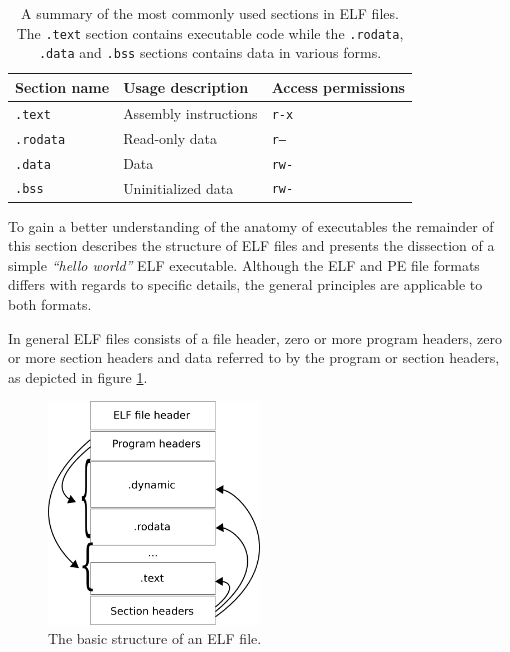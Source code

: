 \documentclass[12pt, a4paper]{article}
\begin{document}
\begin{table}[htbp]
	\begin{center}
		\begin{tabular}{|l|l|l|}
			\hline
			Section name & Usage description & Access permissions \\
			\hline
			\texttt{.text} & Assembly instructions & \texttt{r-x} \\
			\texttt{.rodata} & Read-only data & \texttt{r--} \\
			\texttt{.data} & Data & \texttt{rw-} \\
			\texttt{.bss} & Uninitialized data & \texttt{rw-} \\
			\hline
		\end{tabular}
	\end{center}
	\caption{A summary of the most commonly used sections in ELF files. The \texttt{.text} section contains executable code while the \texttt{.rodata}, \texttt{.data} and \texttt{.bss} sections contains data in various forms.}
	\label{sections}
\end{table}

To gain a better understanding of the anatomy of executables the remainder of this section describes the structure of ELF files and presents the dissection of a simple \textit{``hello world''} ELF executable. Although the ELF and PE file formats differs with regards to specific details, the general principles are applicable to both formats.

In general ELF files consists of a file header, zero or more program headers, zero or more section headers and data referred to by the program or section headers, as depicted in figure \ref{elf_structure}.

\begin{figure}[htbp]
	\begin{center}
		\includegraphics[width=0.5\textwidth]{inc/elf_structure.png}
		\caption{The basic structure of an ELF file.}
		\label{elf_structure}
	\end{center}
\end{figure}
\end{document}
